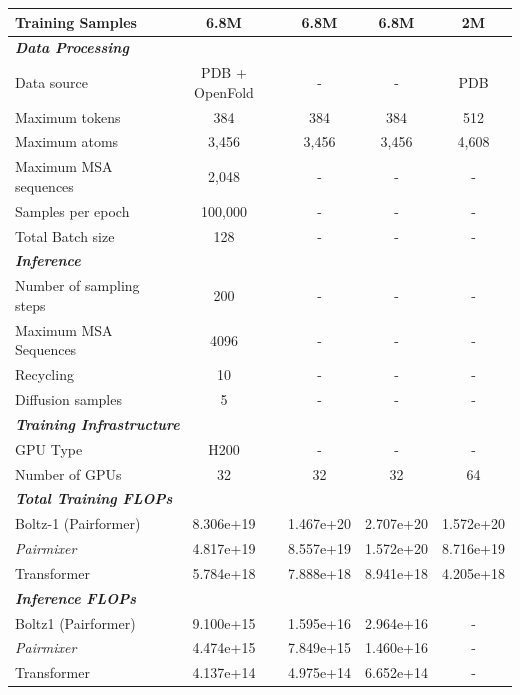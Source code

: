 \documentclass{article} %
\newcommand{\lbltbl}[1]{\label{tbl:#1}}
\def\name{{\textit{Pairmixer}}\xspace}
\begin{document}
\begin{table}[t]
\begin{tabular}{@{}lcccc@{}}
Training Samples       & 6.8M & 6.8M & 6.8M & 2M \\
\midrule
\multicolumn{5}{l}{\textit{\textbf{Data Processing}}} \\
\midrule
Data source            & \small{PDB + OpenFold} & - & - & PDB \\
Maximum tokens         & 384 & 384 & 384 & 512 \\
Maximum atoms          & 3,456 & 3,456 & 3,456 & 4,608 \\
Maximum MSA sequences  & 2,048 & - & - & - \\
Samples per epoch      & 100,000 & - & - & - \\
Total Batch size       & 128 & - & - & - \\
\midrule
\multicolumn{5}{l}{\textit{\textbf{Inference}}} \\
\midrule
Number of sampling steps & 200 & - & - & - \\
Maximum MSA Sequences    & 4096 & - & - & - \\
Recycling                & 10  & - & - & - \\
Diffusion samples        & 5   & - & - & - \\
\midrule
\multicolumn{5}{l}{\textit{\textbf{Training Infrastructure}}} \\
\midrule
GPU Type & H200 & - & - & - \\
Number of GPUs & 32 & 32 & 32 & 64 \\
\midrule
\multicolumn{5}{l}{\textit{\textbf{Total Training FLOPs}}} \\
\midrule
Boltz-1 (Pairformer)   & 8.306e+19 & 1.467e+20 & 2.707e+20 & 1.572e+20 \\
\name                  & 4.817e+19 & 8.557e+19 & 1.572e+20 & 8.716e+19 \\
Transformer            & 5.784e+18 & 7.888e+18 & 8.941e+18 & 4.205e+18 \\
\midrule
\multicolumn{5}{l}{\textit{\textbf{Inference FLOPs}}} \\
\midrule
Boltz1 (Pairformer) & 9.100e+15 & 1.595e+16 & 2.964e+16 & - \\
\name               & 4.474e+15 & 7.849e+15 & 1.460e+16 & - \\
Transformer         & 4.137e+14 & 4.975e+14 & 6.652e+14 & - \\
\bottomrule
\end{tabular}
\lbltbl{boltz1_hyperparameters}
\end{table}
\end{document}

